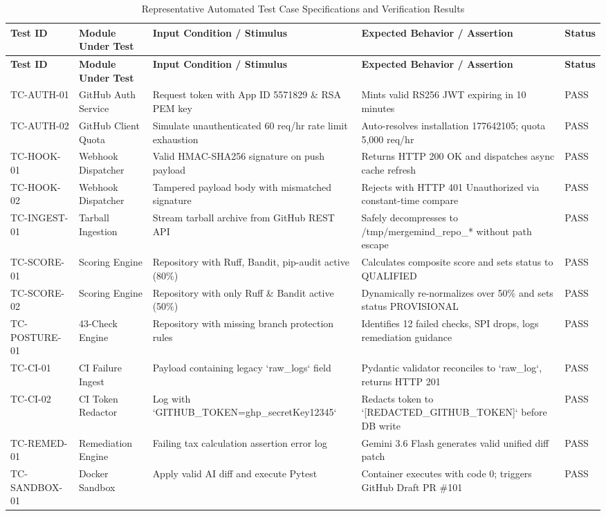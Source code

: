 \begin{longtable}{p{} p{} p{} p{} p{}}
\caption{Representative Automated Test Case Specifications and Verification Results} \label{tab:test-cases} \\
\toprule
\textbf{Test ID} & \textbf{Module Under Test} & \textbf{Input Condition / Stimulus} & \textbf{Expected Behavior / Assertion} & \textbf{Status} \\
\midrule
\endfirsthead
\toprule
\textbf{Test ID} & \textbf{Module Under Test} & \textbf{Input Condition / Stimulus} & \textbf{Expected Behavior / Assertion} & \textbf{Status} \\
\midrule
\endhead
\bottomrule
\endfoot
\bottomrule
\endlastfoot

TC-AUTH-01 & GitHub Auth Service & Request token with App ID 5571829 \& RSA PEM key & Mints valid RS256 JWT expiring in 10 minutes & PASS \\
\addlinespace
TC-AUTH-02 & GitHub Client Quota & Simulate unauthenticated 60 req/hr rate limit exhaustion & Auto-resolves installation 177642105; quota 5,000 req/hr & PASS \\
\addlinespace
TC-HOOK-01 & Webhook Dispatcher & Valid HMAC-SHA256 signature on push payload & Returns HTTP 200 OK and dispatches async cache refresh & PASS \\
\addlinespace
TC-HOOK-02 & Webhook Dispatcher & Tampered payload body with mismatched signature & Rejects with HTTP 401 Unauthorized via constant-time compare & PASS \\
\addlinespace
TC-INGEST-01 & Tarball Ingestion & Stream tarball archive from GitHub REST API & Safely decompresses to /tmp/mergemind\_repo\_* without path escape & PASS \\
\addlinespace
TC-SCORE-01 & Scoring Engine & Repository with Ruff, Bandit, pip-audit active (80\%) & Calculates composite score and sets status to QUALIFIED & PASS \\
\addlinespace
TC-SCORE-02 & Scoring Engine & Repository with only Ruff \& Bandit active (50\%) & Dynamically re-normalizes over 50\% and sets status PROVISIONAL & PASS \\
\addlinespace
TC-POSTURE-01 & 43-Check Engine & Repository with missing branch protection rules & Identifies 12 failed checks, SPI drops, logs remediation guidance & PASS \\
\addlinespace
TC-CI-01 & CI Failure Ingest & Payload containing legacy `raw\_logs` field & Pydantic validator reconciles to `raw\_log`, returns HTTP 201 & PASS \\
\addlinespace
TC-CI-02 & CI Token Redactor & Log with `GITHUB\_TOKEN=ghp\_secretKey12345` & Redacts token to `[REDACTED\_GITHUB\_TOKEN]` before DB write & PASS \\
\addlinespace
TC-REMED-01 & Remediation Engine & Failing tax calculation assertion error log & Gemini 3.6 Flash generates valid unified diff patch & PASS \\
\addlinespace
TC-SANDBOX-01 & Docker Sandbox & Apply valid AI diff and execute Pytest & Container executes with code 0; triggers GitHub Draft PR \#101 & PASS \\
\end{longtable}

